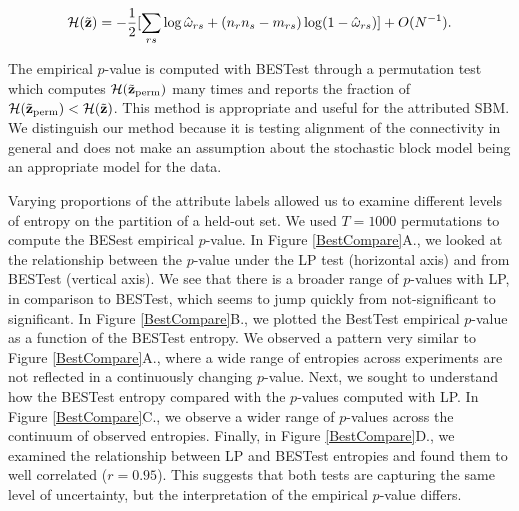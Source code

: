 \begin{equation}
\mathcal{H}({\tilde{\bf z}})=-\frac{1}{2}[\sum_{rs}\log \hat{\omega}_{rs}+(n_{r}n_{s}-m_{rs})\log(1-\hat{\omega}_{rs})]+O(N^{-1}). 
\end{equation}

The empirical $p$-value is computed with BESTest through a permutation test which computes $\mathcal{H}({\tilde{\bf z}}_{\text{perm}})$ many times and reports the fraction of $\mathcal{H}({\tilde{\bf z}}_{\text{perm}})<\mathcal{H}({\tilde{\bf z}})$. This method is appropriate and useful for the attributed SBM. We distinguish our method because it is testing alignment of the connectivity in general and does not make an assumption about the stochastic block model being an appropriate model for the data. 

Varying proportions of the attribute labels allowed us to examine different levels of entropy on the partition of a held-out set. We used $T=1000$ permutations to compute the BESest empirical $p$-value. In Figure \ref{BestCompare}A., we looked at the relationship between the $p$-value under the LP test (horizontal axis) and from BESTest (vertical axis). We see that there is a broader range of $p$-values with LP, in comparison to BESTest, which seems to jump quickly from not-significant to significant. In Figure \ref{BestCompare}B., we plotted the BestTest empirical $p$-value as a function of the BESTest entropy. We observed a pattern very similar to Figure \ref{BestCompare}A., where a wide range of entropies across experiments are not reflected in a continuously changing $p$-value. Next, we sought to understand how the BESTest entropy compared with the $p$-values computed with LP. In Figure \ref{BestCompare}C., we observe a wider range of $p$-values across the continuum of observed entropies. Finally, in Figure \ref{BestCompare}D., we examined the relationship between LP and BESTest entropies and found them to well correlated ($r=0.95$). This suggests that both tests are capturing the same level of uncertainty, but the interpretation of the empirical $p$-value differs. 

